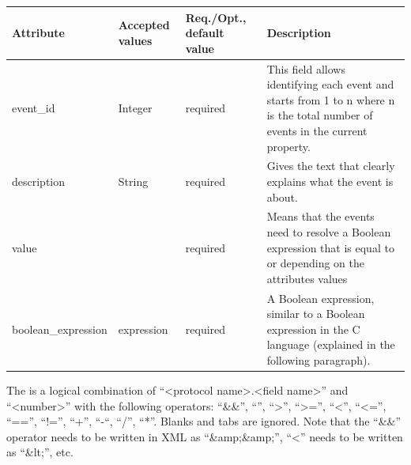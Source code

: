 \begin{table}[H]
\label{ev_att}
    \begin{adjustwidth}{-2in}{-.5in} 
        \begin{center}
\begin{supertabular}{|m{1.3941599in}|m{1.0254599in}|m{1.0004599in}|m{3.10736in}|}
\hline
{}
 Attribute &
 Accepted values &
 Req./Opt., default value &
 Description
\\\hline
event\_id &
Integer &
required &
This field allows identifying each event and starts from 1 to n where n is the total number of events in the current property.\\\hline
description &
String &
required &
Gives the text that clearly explains what the event is about.\\\hline
value &
 &
required &
Means that the events need to resolve a Boolean expression that is equal
to  or
 depending on the
attributes values\\\hline
boolean\_expression &
expression &
required &
A Boolean expression, similar to a Boolean expression in the C language
(explained in the following paragraph).\\\hline
\end{supertabular}
        \end{center}
    \end{adjustwidth}
\end{table}


 The  is a logical combination of
{\textquotedblleft}{\textless}protocol
name{\textgreater}.{\textless}field
name{\textgreater}{\textquotedblright} and
{\textquotedblleft}{\textless}number{\textgreater}{\textquotedblright}
with the following operators:
{\textquotedblleft}\&\&{\textquotedblright},
{\textquotedblleft}{\textbar}{\textbar}{\textquotedblright},
{\textquotedblleft}{\textgreater}{\textquotedblright},
{\textquotedblleft}{\textgreater}={\textquotedblright},
{\textquotedblleft}{\textless}{\textquotedblright},
{\textquotedblleft}{\textless}={\textquotedblright},
{\textquotedblleft}=={\textquotedblright},
{\textquotedblleft}!={\textquotedblright},
{\textquotedblleft}+{\textquotedblright},
{\textquotedblleft}-{\textquotedblleft},
{\textquotedblleft}/{\textquotedblright},
{\textquotedblleft}*{\textquotedblright}. Blanks and tabs are ignored.
Note that the {\textquotedblleft}\&\&{\textquotedblright} operator
needs to be written in XML as
{\textquotedblleft}\&amp;\&amp;{\textquotedblright}, 
{\textquotedblleft}{\textless}{\textquotedblright} 
needs to be written as
{\textquotedblleft}\&lt;{\textquotedblright}, etc.


